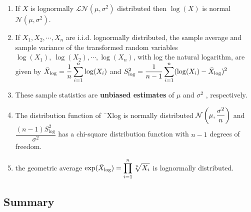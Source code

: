 \begin{enumerate}
    \item If $X$ is lognormally $\mathcal{L N} (\mu, \sigma^2)$ distributed then $\log(X)$ is normal $\mathcal{N} (\mu, \sigma^2)$. 
    \hfill \cite{statistics/book/Statistics-for-Data-Scientists/Maurits-Kaptein}

    \item If $X_1 , X_2, \cdots , X _n$ are i.i.d. lognormally distributed, the sample average and sample variance of the transformed random variables $\log (X_1),\ \log (X_2) , \cdots , \log (X_ n )$, with log the natural logarithm, are given by
    $
        \bar{X}_{\log} = \dfrac{1}{n} \displaystyle\sum^n _{i=1} \log (X _i )
    $
    and
    $
        S^2 _{\log} = \dfrac{1 }{n - 1} \displaystyle\sum^n _{i=1} (\log (X _i ) - \bar{X}_{\log} )^2
    $
    \hfill \cite{statistics/book/Statistics-for-Data-Scientists/Maurits-Kaptein}

    \item These sample statistics are \textbf{unbiased estimates} of $\mu$ and $\sigma^ 2$ , respectively.
    \hfill \cite{statistics/book/Statistics-for-Data-Scientists/Maurits-Kaptein}

    \item The distribution function of ¯Xlog is normally distributed $\mathcal{N} \left(\mu, \dfrac{\sigma ^ 2}{n}\right)$ and $\dfrac{(n - 1) S^2 _{\log}}{\sigma ^ 2}$ has a chi-square distribution function with $n - 1$ degrees of freedom.  
    \hfill \cite{statistics/book/Statistics-for-Data-Scientists/Maurits-Kaptein}

    \item the geometric average $\exp ( \bar{X}_{\log} ) = \displaystyle\prod ^n _{i=1} \sqrt[n]{{X}_ i}$ is lognormally distributed.
    \hfill \cite{statistics/book/Statistics-for-Data-Scientists/Maurits-Kaptein}
\end{enumerate}









\subsection{Summary}

